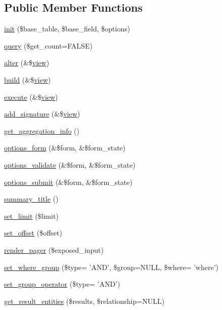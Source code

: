 \subsection*{Public Member Functions}
\begin{DoxyCompactItemize}
\item 
\hyperlink{classviews__plugin__query_a56239b387c0634fde577cbb355abff9d}{init} (\$base\_\-table, \$base\_\-field, \$options)
\item 
\hyperlink{classviews__plugin__query_a0609aead46ab39359c4bd5210338e819}{query} (\$get\_\-count=FALSE)
\item 
\hyperlink{classviews__plugin__query_a19995bd24c67d383d8f6393b19a1ebfe}{alter} (\&\$\hyperlink{classview}{view})
\item 
\hyperlink{classviews__plugin__query_afe5f004315f6e60d76f7365407a49e45}{build} (\&\$\hyperlink{classview}{view})
\item 
\hyperlink{classviews__plugin__query_a9de6da4d1c256b88f8dc1a630332abe9}{execute} (\&\$\hyperlink{classview}{view})
\item 
\hyperlink{classviews__plugin__query_ac6c76ccb108e97f5662bec62877894f4}{add\_\-signature} (\&\$\hyperlink{classview}{view})
\item 
\hyperlink{classviews__plugin__query_a0628a8a185bd8d5717887dcdd9dae7db}{get\_\-aggregation\_\-info} ()
\item 
\hyperlink{classviews__plugin__query_a9d5e25ce4c997a4e341ef3c3a464736a}{options\_\-form} (\&\$form, \&\$form\_\-state)
\item 
\hyperlink{classviews__plugin__query_ad40827dad9fa00e8a1ff57d8a8d979de}{options\_\-validate} (\&\$form, \&\$form\_\-state)
\item 
\hyperlink{classviews__plugin__query_adf4a74ae9fba5fbbc9a742b5b4947437}{options\_\-submit} (\&\$form, \&\$form\_\-state)
\item 
\hyperlink{classviews__plugin__query_a501630ab900fb802d83366fd4a76b646}{summary\_\-title} ()
\item 
\hyperlink{classviews__plugin__query_af0ecebf1eeb808ff9d2c78d8e63fc302}{set\_\-limit} (\$limit)
\item 
\hyperlink{classviews__plugin__query_acdea49538238dddde6704ba43c358e4f}{set\_\-offset} (\$offset)
\item 
\hyperlink{classviews__plugin__query_aa5d58adf253ec0eb0621af8ffb8aef02}{render\_\-pager} (\$exposed\_\-input)
\item 
\hyperlink{classviews__plugin__query_af7b4464ab8bd401d45c9eaa53f94a26c}{set\_\-where\_\-group} (\$type= 'AND', \$group=NULL, \$where= 'where')
\item 
\hyperlink{classviews__plugin__query_a5ba8dc4bebc3b60cb92206e1862ee196}{set\_\-group\_\-operator} (\$type= 'AND')
\item 
\hyperlink{classviews__plugin__query_a36cb34e719977950d9d78a4f11f761a8}{get\_\-result\_\-entities} (\$results, \$relationship=NULL)
\end{DoxyCompactItemize}

